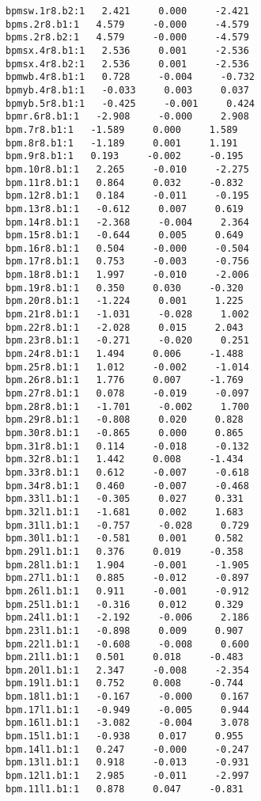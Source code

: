 \begin{verbatim}
bpmsw.1r8.b2:1   2.421     0.000     -2.421
bpms.2r8.b1:1   4.579     -0.000     -4.579
bpms.2r8.b2:1   4.579     -0.000     -4.579
bpmsx.4r8.b1:1   2.536     0.001     -2.536
bpmsx.4r8.b2:1   2.536     0.001     -2.536
bpmwb.4r8.b1:1   0.728     -0.004     -0.732
bpmyb.4r8.b1:1   -0.033     0.003     0.037
bpmyb.5r8.b1:1   -0.425     -0.001     0.424
bpmr.6r8.b1:1   -2.908     -0.000     2.908
bpm.7r8.b1:1   -1.589     0.000     1.589
bpm.8r8.b1:1   -1.189     0.001     1.191
bpm.9r8.b1:1   0.193     -0.002     -0.195
bpm.10r8.b1:1   2.265     -0.010     -2.275
bpm.11r8.b1:1   0.864     0.032     -0.832
bpm.12r8.b1:1   0.184     -0.011     -0.195
bpm.13r8.b1:1   -0.612     0.007     0.619
bpm.14r8.b1:1   -2.368     -0.004     2.364
bpm.15r8.b1:1   -0.644     0.005     0.649
bpm.16r8.b1:1   0.504     -0.000     -0.504
bpm.17r8.b1:1   0.753     -0.003     -0.756
bpm.18r8.b1:1   1.997     -0.010     -2.006
bpm.19r8.b1:1   0.350     0.030     -0.320
bpm.20r8.b1:1   -1.224     0.001     1.225
bpm.21r8.b1:1   -1.031     -0.028     1.002
bpm.22r8.b1:1   -2.028     0.015     2.043
bpm.23r8.b1:1   -0.271     -0.020     0.251
bpm.24r8.b1:1   1.494     0.006     -1.488
bpm.25r8.b1:1   1.012     -0.002     -1.014
bpm.26r8.b1:1   1.776     0.007     -1.769
bpm.27r8.b1:1   0.078     -0.019     -0.097
bpm.28r8.b1:1   -1.701     -0.002     1.700
bpm.29r8.b1:1   -0.808     0.020     0.828
bpm.30r8.b1:1   -0.865     0.000     0.865
bpm.31r8.b1:1   0.114     -0.018     -0.132
bpm.32r8.b1:1   1.442     0.008     -1.434
bpm.33r8.b1:1   0.612     -0.007     -0.618
bpm.34r8.b1:1   0.460     -0.007     -0.468
bpm.33l1.b1:1   -0.305     0.027     0.331
bpm.32l1.b1:1   -1.681     0.002     1.683
bpm.31l1.b1:1   -0.757     -0.028     0.729
bpm.30l1.b1:1   -0.581     0.001     0.582
bpm.29l1.b1:1   0.376     0.019     -0.358
bpm.28l1.b1:1   1.904     -0.001     -1.905
bpm.27l1.b1:1   0.885     -0.012     -0.897
bpm.26l1.b1:1   0.911     -0.001     -0.912
bpm.25l1.b1:1   -0.316     0.012     0.329
bpm.24l1.b1:1   -2.192     -0.006     2.186
bpm.23l1.b1:1   -0.898     0.009     0.907
bpm.22l1.b1:1   -0.608     -0.008     0.600
bpm.21l1.b1:1   0.501     0.018     -0.483
bpm.20l1.b1:1   2.347     -0.008     -2.354
bpm.19l1.b1:1   0.752     0.008     -0.744
bpm.18l1.b1:1   -0.167     -0.000     0.167
bpm.17l1.b1:1   -0.949     -0.005     0.944
bpm.16l1.b1:1   -3.082     -0.004     3.078
bpm.15l1.b1:1   -0.938     0.017     0.955
bpm.14l1.b1:1   0.247     -0.000     -0.247
bpm.13l1.b1:1   0.918     -0.013     -0.931
bpm.12l1.b1:1   2.985     -0.011     -2.997
bpm.11l1.b1:1   0.878     0.047     -0.831

\end{verbatim}
